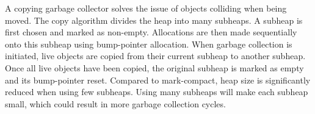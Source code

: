 \newpage
A copying garbage collector solves the issue of objects colliding when being moved. The copy algorithm divides the heap into many subheaps. A subheap is first chosen and marked as non-empty. Allocations are then made sequentially onto this subheap using bump-pointer allocation. When garbage collection is initiated, live objects are copied from their current subheap to another subheap. Once all live objects have been copied, the original subheap is marked as empty and its bump-pointer reset. Compared to mark-compact, heap size is significantly reduced when using few subheaps. Using many subheaps will make each subheap small, which could result in more garbage collection cycles.

